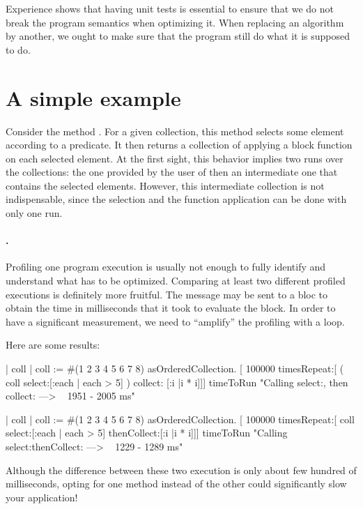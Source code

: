 \documentclass[a4paper,10pt,twoside]{book}
\begin{document}
Experience shows that having unit tests is essential to ensure that we do not break the program semantics when optimizing it. When replacing an algorithm by another, we ought to make sure that the program still do what it is supposed to do.


\section{A simple example}

Consider the method . For a given collection, this method selects some element according to a predicate. It then returns a collection of applying a block function on each selected element. At the first sight, this behavior implies two runs over the collections: the one provided by the user of  then an intermediate one that contains the selected elements. However, this intermediate collection is not indispensable, since the selection and the function application can be done with only one run.

\paragraph{.} Profiling one program execution is usually not enough to fully identify and understand what has to be optimized. Comparing at least two different profiled executions is definitely more fruitful. The message  may be sent to a bloc to obtain the time in milliseconds that it took to evaluate the block. In order to have a significant measurement, we need to ``amplify'' the profiling with a loop.

Here are some results:
\begin{code}{}
	| coll |
	coll := #(1 2 3 4 5 6 7 8) asOrderedCollection. 
	[ 100000 timesRepeat:[ ( coll select:[:each | each > 5] ) collect: [:i |i * i]]] timeToRun
	"Calling select:, then collect: ---> ~ 1951 - 2005 ms"

	| coll |
	coll := #(1 2 3 4 5 6 7 8) asOrderedCollection. 
	[ 100000 timesRepeat:[ coll select:[:each | each > 5] thenCollect:[:i |i * i]]] timeToRun
	"Calling select:thenCollect: ---> ~ 1229 - 1289 ms"
\end{code}

Although the difference between these two execution is only about few hundred of milliseconds, opting for one method instead of the other could significantly slow your application!
\end{document}
